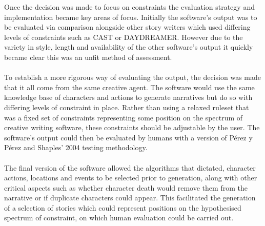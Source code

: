 \documentclass[letterpaper]{article}
\begin{document}
Once the decision was made to focus on constraints the evaluation strategy and implementation became key areas of focus. Initially the software's output was to be evaluated via comparison alongside other story writers which used differing levels of constraints such as CAST or DAYDREAMER. However due to the variety in style, length and availability of the other software's output it quickly became clear this was an unfit method of assessment.\\
\\To establish a more rigorous way of evaluating the output, the decision was made that it all come from the same creative agent. The software would use the same knowledge base of characters and actions to generate narratives but do so with differing levels of constraint in place. Rather than using a relaxed ruleset that was a fixed set of constraints representing some position on the spectrum of creative writing software, these constraints should be adjustable by the user. The software's output could then be evaluated by humans with a version of P\'erez y P\'erez and Shaples' 2004 testing methodology.\\
\\The final version of the software allowed the algorithms that dictated, character actions, locations and events to be selected prior to generation, along with other critical aspects such as whether character death would remove them from the narrative or if duplicate characters could appear. This facilitated the generation of a selection of stories which could represent positions on the hypothesised spectrum of constraint, on which human evaluation could be carried out.

\end{document}
